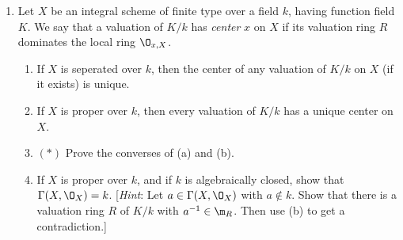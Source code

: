\documentclass[12pt]{amsart}
\begin{document}
\begin{enumerate}
  \item[4.5.] {
      Let $X$ be an integral scheme of finite type over a field $k$, having function field $K$.
      We say that a valuation of $K/k$ has \emph{center} $x$ on $X$ if its valuation ring $R$ dominates the local ring $\O_{x,X}$.
      \begin{enumerate}
        \item If $X$ is seperated over $k$, then the center of any valuation of $K/k$ on $X$ (if it exists) is unique.
        \item If $X$ is proper over $k$, then every valuation of $K/k$ has a unique center on $X$.
        \item $(*)$ Prove the converses of (a) and (b).
        \item If $X$ is proper over $k$, and if $k$ is algebraically closed, show that $\Gamma(X,\O_X)=k$.
          [\emph{Hint}: Let $a\in \Gamma(X,\O_X)$ with $a\notin k$.
          Show that there is a valuation ring $R$ of $K/k$ with $a^{-1}\in \m_R$.
          Then use (b) to get a contradiction.]
      \end{enumerate}
    }
\end{enumerate}
\end{document}
